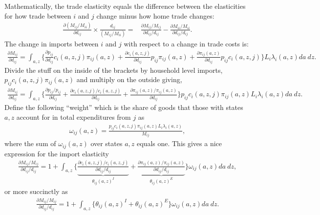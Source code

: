 \documentclass[12pt,pdftex]{article}
\begin{document}
\begin{onehalfspacing}
Mathematically, the trade elasticity equals the difference between the elasticities for how trade between $i$ and $j$ change minus how home trade changes:
\begin{align}
\frac{\partial ( M_{ij} / M_{ii} )}{\partial d_{ij}} \times \frac{d_{ij}}{( M_{ij} / M_{ii} )} =& \frac{\partial M_{ij} / M_{ij}}{\partial d_{ij} / d_{ij}}  - \frac{\partial M_{ii} / M_{ii}}{\partial d_{ij} / d_{ij}}.
\label{apx-eq:def_trade_elasticity}
\end{align}
The change in imports between $i$ and $j$ with respect to a change in trade costs is:
\begin{align}
\frac{\partial  M_{ij}}{\partial d_{ij}} = \int_{a,z} \bigg \{\frac{\partial p_{ij}}{\partial d_{ij}} c_{i}(a,z,j) \pi_{ij}(a,z) +  \frac{\partial c_{i}(a,z,j)}{\partial d_{ij}} p_{ij} \pi_{ij}(a,z) +
 \frac{\partial \pi_{ij}(a,z)}{\partial d_{ij}} p_{ij}c_{i}(a,z,j) \bigg \} L_i \lambda_{i}(a,z) da \ dz.
\end{align}
Divide the stuff on the inside of the brackets by household level imports, $p_{ij}c_{i}(a,z,j)\pi_{ij}(a,z)$ and multiply on the outside giving,
\begin{align}
\frac{\partial  M_{ij}}{\partial d_{ij}} = \int_{a,z}  \bigg \{ \frac{\partial p_{ij}/p_{ij}}{\partial d_{ij}}  + \frac{\partial c_{i}(a,z,j)/ c_{i}(a,z,j)}{\partial d_{ij}} +
 \frac{\partial \pi_{ij}(a,z) / \pi_{ij}(a,z)}{\partial d_{ij}}  \bigg \} p_{ij}c_{i}(a,z,j)\pi_{ij}(a,z) L_i \lambda_{i}(a,z)da \ dz.
\end{align}
Define the following ``weight'' which is the share of goods that those with states $a,z$ account for in total expenditures from $j$ as
\begin{align}
\omega_{ij}(a,z) = \frac{p_{ij}c_{i}(a,z,j)\pi_{ij}(a,z) L_i \lambda_{i}(a,z)}{M_{ij}},
\end{align}
where the sum of $\omega_{ij}(a,z)$ over states $a,z$ equals one. This gives a nice expression for the import elasticity
\begin{align}
\frac{\partial  M_{ij} / M_{ij}}{\partial d_{ij} / d_{ij}} = 1 + \int_{a,z} \bigg \{ \underbrace{ \frac{\partial c_{i}(a,z,j)/ c_{i}(a,z,j)}{\partial d_{ij} / d_{ij}} }_{\theta_{ij}(a,z)^{I}}+
\underbrace{\frac{\partial \pi_{ij}(a,z) / \pi_{ij}(a,z)}{\partial d_{ij} / d_{ij}} }_{\theta_{ij}(a,z)^{E}} \bigg \} \omega_{ij}(a,z)da \ dz,
\end{align}
or more succinctly as
\begin{align}
\frac{\partial  M_{ij} / M_{ij}}{\partial d_{ij} / d_{ij}} = 1 + \int_{a,z} \bigg \{ \theta_{ij}(a,z)^{I} + \theta_{ij}(a,z)^{E} \bigg \}\omega_{ij}(a,z)da \ dz.

\end{align}
\end{onehalfspacing}
\end{document}
